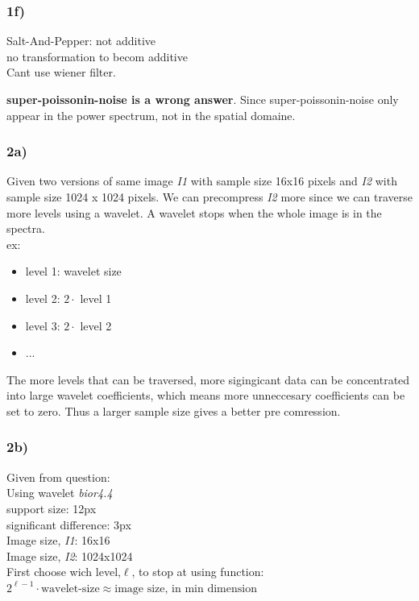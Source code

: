 \documentclass[12pt]{article}
\begin{document}
    \subsubsection*{1f)}
    Salt-And-Pepper: not additive \\
    no transformation to becom additive \\
    Cant use wiener filter.
    
    \textbf{super-poissonin-noise is a wrong answer}. Since super-poissonin-noise only appear in the power spectrum, not in the spatial domaine.
        
    \subsubsection*{2a)}
    Given two versions of same image \textit{I1} with sample size 16x16 pixels and \textit{I2} with sample size 1024 x 1024 pixels. We can precompress \textit{I2} more since we can traverse more levels using a wavelet. A wavelet stops when the whole image is in the spectra.\\ 
    ex:\\
    \begin{itemize}
    \item level 1: wavelet size
    \item level 2: $2 \cdot$ level 1
    \item level 3: $2 \cdot$ level 2
    \item ...
    \end{itemize}
    
    The more levels that can be traversed, more sigingicant data can be concentrated into large wavelet coefficients, which means more unneccesary coefficients can be set to zero. Thus a larger sample size gives a better pre comression.
    
    \subsubsection*{2b)}
    Given from question: \\
    Using wavelet \textit{bior4.4} \\
    support size: 12px \\
    significant difference: 3px\\
    Image size, \textit{I1}: 16x16\\
    Image size, \textit{I2}: 1024x1024\\
    
    First choose wich level,$\ell$, to stop at using function:\\
    $2^{\ell-1} \cdot \text{wavelet-size} \approx \text{image size, in min dimension}$
    
\end{document}
